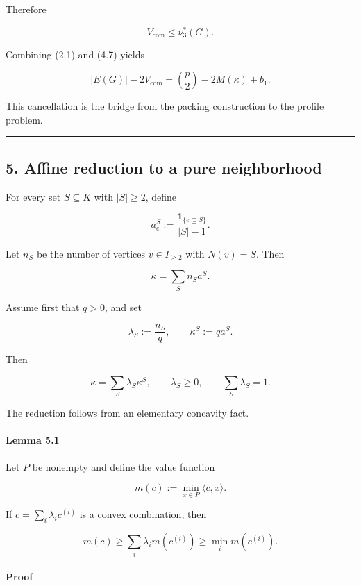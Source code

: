 \documentclass[
  american,
  11pt,
  a4paper,
]{article}
\newcounter{none} %
\begin{document}
Therefore

\[
V_{\mathrm{com}}\le\nu_3^*(G).
\tag{4.8}
\]

Combining (2.1) and (4.7) yields

\[
\boxed{
|E(G)|-2V_{\mathrm{com}}
=
\binom{p}{2}-2M(\kappa)+b_1.
}
\tag{4.9}
\]

This cancellation is the bridge from the packing construction to the profile problem.

\begin{center}\rule{0.5\linewidth}{0.5pt}\end{center}

\subsection{5. Affine reduction to a pure neighborhood}\label{affine-reduction-to-a-pure-neighborhood}

For every set \(S\subseteq K\) with \(|S|\ge2\), define

\[
a_e^S
:=
\frac{\mathbf1_{\{e\subseteq S\}}}{|S|-1}.
\tag{5.1}
\]

Let \(n_S\) be the number of vertices \(v\in I_{\ge2}\) with \(N(v)=S\). Then

\[
\kappa=\sum_Sn_Sa^S.
\tag{5.2}
\]

Assume first that \(q>0\), and set

\[
\lambda_S:=\frac{n_S}{q},
\qquad
\kappa^S:=qa^S.
\]

Then

\[
\kappa=\sum_S\lambda_S\kappa^S,
\qquad
\lambda_S\ge0,
\qquad
\sum_S\lambda_S=1.
\tag{5.3}
\]

The reduction follows from an elementary concavity fact.

\paragraph{Lemma 5.1}\label{lemma-5.1}

Let \(P\) be nonempty and define the value function

\[
m(c):=\min_{x\in P}\langle c,x\rangle.
\]

If \(c=\sum_i\lambda_ic^{(i)}\) is a convex combination, then

\[
m(c)
\ge
\sum_i\lambda_i m(c^{(i)})
\ge
\min_i m(c^{(i)}).
\]

\paragraph{Proof}\label{proof-1}
\end{document}
